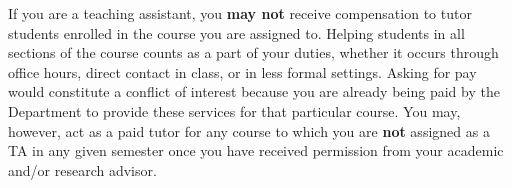 If you are a teaching assistant, you \textbf{may not} receive
compensation to tutor students enrolled in the course you are assigned
to.  Helping students in all sections of the course counts as a part
of your duties, whether it occurs through office hours, direct contact
in class, or in less formal settings.  Asking for pay would constitute
a conflict of interest because you are already being paid by the
Department to provide these services for that particular course.  You
may, however, act as a paid tutor for any course to which you are
\textbf{not} assigned as a TA in any given semester once you have
received permission from your academic and/or research advisor.
